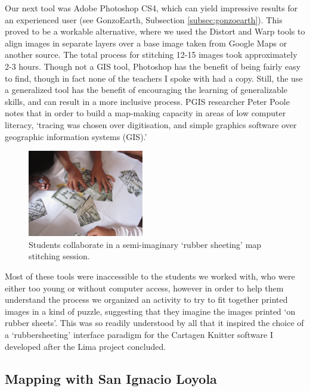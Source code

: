 \documentclass[11pt,oneside,notitlepage]{report}
\begin{document}
Our next tool was Adobe Photoshop CS4, which can yield impressive results for an experienced user (see GonzoEarth, Subsection \ref{subsec:gonzoearth}). This proved to be a workable alternative, where we used the Distort and Warp tools to align images in separate layers over a base image taken from Google Maps or another source. The total process for stitching 12-15 images took approximately 2-3 hours. Though not a GIS tool, Photoshop has the benefit of being fairly easy to find, though in fact none of the teachers I spoke with had a copy. Still, the use a generalized tool has the benefit of encouraging the learning of generalizable skills, and can result in a more inclusive process. PGIS researcher Peter Poole notes that in order to build a map-making capacity in areas of low computer literacy, `tracing was chosen over digitisation, and simple graphics software over geographic information systems (GIS).' \cite{poole2006there}

\begin{figure}
	\begin{flushright}
		\includegraphics[width=0.45\textwidth]{images/juan-pablo-rubbersheeting.jpg}
		\caption{Students collaborate in a semi-imaginary `rubber sheeting' map stitching session.}
	\end{flushright}
\end{figure}

Most of these tools were inaccessible to the students we worked with, who were either too young or without computer access, however in order to help them understand the process we organized an activity to try to fit together printed images in a kind of puzzle, suggesting that they imagine the images printed `on rubber sheets'. This was so readily understood by all that it inspired the choice of a `rubbersheeting' interface paradigm for the Cartagen Knitter software I developed after the Lima project concluded. 

\subsection{Mapping with San Ignacio Loyola}
\end{document}
